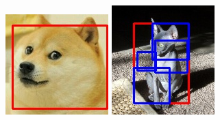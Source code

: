 \documentclass[conference,compsoc]{IEEEtran}
\begin{document}
\begin{figure}
\begin{multicols}{4}
    		\includegraphics[height=1.3\linewidth]{dogeFace.jpg}\par 
    		\includegraphics[height=1.3\linewidth]{smolrect.jpg}\par

\end{multicols}
\end{figure}
\end{document}
